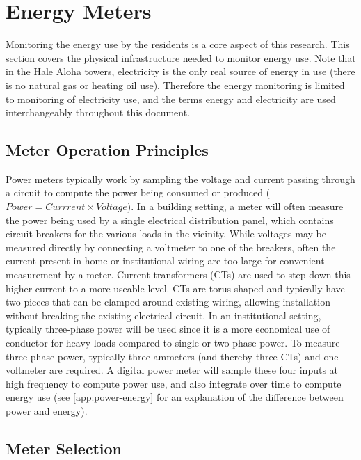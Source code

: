\section{Energy Meters}
\label{sec:energy-meters}

Monitoring the energy use by the residents is a core aspect of this research. This section covers the physical infrastructure needed to monitor energy use. Note that in the Hale Aloha towers, electricity is the only real source of energy in use (there is no natural gas or heating oil use). Therefore the energy monitoring is limited to monitoring of electricity use, and the terms energy and electricity are used interchangeably throughout this document.


\subsection{Meter Operation Principles}

Power meters typically work by sampling the voltage and current passing through a circuit to compute the power being consumed or produced ($Power = Currrent \times Voltage$). In a building setting, a meter will often measure the power being used by a single electrical distribution panel, which contains circuit breakers for the various loads in the vicinity. While voltages may be measured directly by connecting a voltmeter to one of the breakers, often the current present in home or institutional wiring are too large for convenient measurement by a meter. Current transformers (CTs) are used to step down this higher current to a more useable level. CTs are torus-shaped and typically have two pieces that can be clamped around existing wiring, allowing installation without breaking the existing electrical circuit. In an institutional setting, typically three-phase power will be used since it is a more economical use of conductor for heavy loads compared to single or two-phase power. To measure three-phase power, typically three ammeters (and thereby three CTs) and one voltmeter are required. A digital power meter will sample these four inputs at high frequency to compute power use, and also integrate over time to compute energy use (see \autoref{app:power-energy} for an explanation of the difference between power and energy).


\subsection{Meter Selection}
\label{sec:meter-selection}

